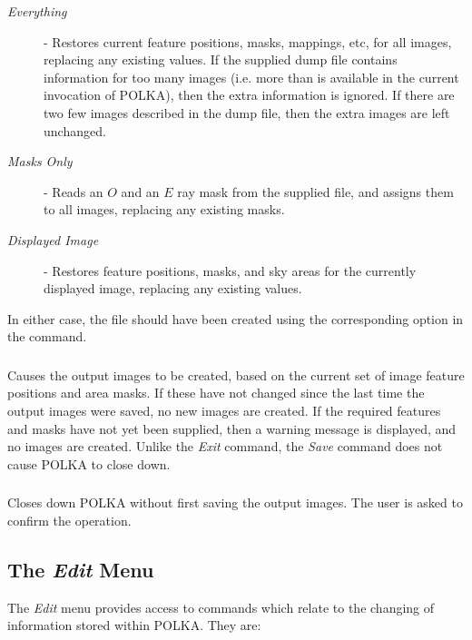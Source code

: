 \begin{description}

\item [{\em Everything}] - Restores current feature positions, masks,
mappings, etc, for all images, replacing any existing values. If the
supplied dump file contains information for too many images (i.e. more
than is available in the current invocation of POLKA), then the extra
information is ignored. If there are two few images described in the dump
file, then the extra images are left unchanged.

\item [{\em Masks Only}] - Reads an $O$ and an $E$ ray mask from the supplied
file, and assigns them to all images, replacing any existing masks.

\item [{\em Displayed Image}] - Restores feature positions, masks, and
sky areas for the currently displayed image, replacing any existing values. 

\end{description}

In either case, the file should have been created using the
corresponding option in the  command. 

\subsubsection {} Causes the output images to be
created, based on the current set of image feature positions and area masks. If
these have not changed since the last time the output images were saved,
no new images are created. If the required features and masks have not
yet been supplied, then a warning message is displayed, and no images are
created. Unlike the {\em Exit} command, the {\em Save} command does not
cause POLKA to close down.

\subsubsection {} Closes down POLKA without first saving the output
images. The user is asked to confirm the operation.

\subsection {The {\em Edit} Menu}
The {\em Edit} menu provides access to commands which relate to
the changing of information stored within POLKA. They are:

